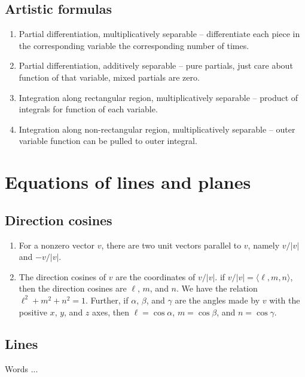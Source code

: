 \documentclass[10pt]{amsart}
\begin{document}
\subsection{Artistic formulas}

\begin{enumerate}
\item Partial differentiation, multiplicatively separable --
  differentiate each piece in the corresponding variable the
  corresponding number of times.
\item Partial differentiation, additively separable -- pure partials,
  just care about function of that variable, mixed partials are zero.
\item Integration along rectangular region, multiplicatively
  separable -- product of integrals for function of each variable.
\item Integration along non-rectangular region, multiplicatively
  separable -- outer variable function can be pulled to outer integral.
\end{enumerate}

\section{Equations of lines and planes}
\subsection{Direction cosines}

\begin{enumerate}
\item For a nonzero vector $v$, there are two unit vectors parallel to
  $v$, namely $v/|v|$ and $-v/|v|$.
\item The direction cosines of $v$ are the coordinates of $v/|v|$. if
  $v/|v| = \langle \ell,m,n \rangle$, then the direction cosines are
  $\ell$, $m$, and $n$. We have the relation $\ell^2 + m^2 + n^2 =
  1$. Further, if $\alpha$, $\beta$, and $\gamma$ are the angles made
  by $v$ with the positive $x$, $y$, and $z$ axes, then $\ell = \cos
  \alpha$, $m = \cos \beta$, and $n = \cos \gamma$.
\end{enumerate}

\subsection{Lines}
Words ...
\end{document}
